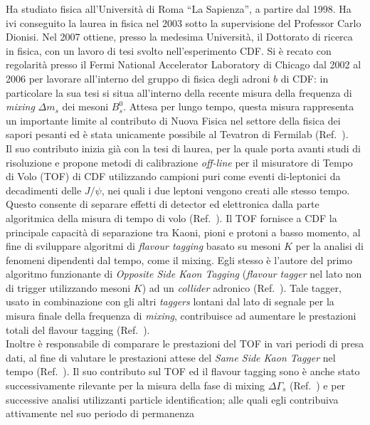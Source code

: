 \documentclass{article}
\begin{document}
\begin{vita}
Ha studiato fisica all'Universit\`{a} di Roma ``La Sapienza'', a
partire dal 1998. Ha ivi conseguito la laurea in fisica nel 2003 sotto
la supervisione del Professor Carlo Dionisi. Nel 2007 ottiene, presso
la medesima Universit\`{a}, il Dottorato di ricerca in fisica, con un
lavoro di tesi svolto nell'esperimento CDF. Si \`{e} recato con
regolarit\`{a} presso il Fermi National Accelerator Laboratory di
Chicago dal 2002 al 2006 per lavorare all'interno del gruppo di fisica
degli adroni $b$ di CDF: in particolare la sua tesi si situa
all'interno della recente misura della frequenza di {\it mixing}
$\Delta m_{s}$ dei mesoni $B_{s}^{0}$. Attesa per lungo tempo, questa misura rappresenta
un importante limite al contributo di Nuova Fisica nel settore della fisica dei
sapori pesanti ed \`{e} stata unicamente possibile al Tevatron di
Fermilab (Ref.~).\\ 
Il suo contributo inizia gi\`a con la tesi di laurea, per la quale
porta avanti studi di risoluzione e propone metodi di calibrazione {\it off-line} per il misuratore di Tempo
di Volo (TOF) di CDF utilizzando campioni puri come eventi
di-leptonici da decadimenti delle $J/\psi$, nei quali i due leptoni
vengono creati alle stesso tempo. Questo consente di separare effetti
di detector ed elettronica dalla parte algoritmica della misura di
tempo di volo (Ref.~). Il TOF fornisce a CDF la principale capacit\`a di separazione tra
Kaoni, pioni e protoni a basso momento, al fine di sviluppare
algoritmi di {\it flavour tagging} basato su mesoni $K$ per la analisi
di fenomeni dipendenti dal tempo, come il mixing. 
Egli stesso \`e l'autore del primo algoritmo funzionante di
{\it Opposite Side Kaon Tagging} ({\it flavour tagger} nel lato non di trigger utilizzando
mesoni $K$) ad un {\it collider} adronico (Ref.~).
Tale tagger, usato in
combinazione con gli altri {\it taggers} lontani dal lato di segnale
per la misura finale della frequenza di {\it mixing}, contribuisce ad
aumentare le prestazioni totali del flavour tagging (Ref.~).\\
Inoltre \`e responsabile di comparare le prestazioni del
TOF in vari periodi di presa dati, al fine di valutare le prestazioni
attese del {\it Same Side Kaon Tagger} nel tempo (Ref.~).
Il suo contributo sul TOF ed il flavour tagging sono \`e anche stato
successivamente rilevante per la misura della fase di mixing $\Delta
\Gamma_{s}$ (Ref.~) e per successive analisi utilizzanti 
particle identification;
alle quali egli contribuiva attivamente nel suo periodo di permanenza

\end{vita}
\end{document}
